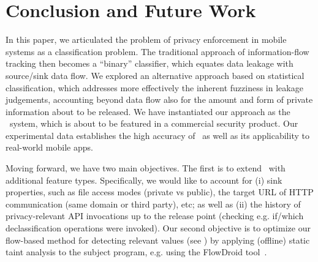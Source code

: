 \section{Conclusion and Future Work}\label{Se:conclusion}

In this paper, we articulated the problem of privacy enforcement in mobile systems as a classification problem. The traditional approach of information-flow tracking then becomes a ``binary'' classifier, which equates data leakage with source/sink data flow. We explored an alternative approach based on statistical classification, which addresses more effectively the inherent fuzziness in leakage judgements, accounting beyond data flow also for the amount and form of private information about to be released. We have instantiated our approach as the \Tool\ system, which is about to be featured in a commercial security product. Our experimental data establishes the high accuracy of \Tool\ as well as its applicability to real-world mobile apps.

Moving forward, we have two main objectives. The first is to extend \Tool\ with additional feature types. Specifically, we would like to account for (i) sink properties, such as file access modes (private vs public), the target URL of HTTP communication (same domain or third party), etc; as well as (ii) the history of privacy-relevant API invocations up to the release point (checking e.g. if/which declassification operations were invoked). Our second objective is to optimize our flow-based method for detecting relevant values (see ) by applying (offline) static taint analysis to the subject program, e.g. using the FlowDroid tool~\cite{FARBBKTOM:TR13}.  